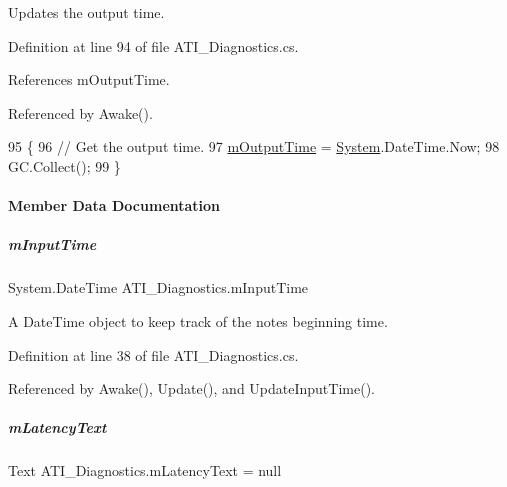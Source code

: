 Updates the output time. 



Definition at line 94 of file A\+T\+I\+\_\+\+Diagnostics.\+cs.



References m\+Output\+Time.



Referenced by Awake().


\begin{DoxyCode}
95     \{
96         \textcolor{comment}{// Get the output time.}
97         \hyperlink{group___audio_testing_a2e6f675a990948db789381f52071e1bf}{mOutputTime} = \hyperlink{namespace_system}{System}.DateTime.Now;
98         GC.Collect();
99     \}
\end{DoxyCode}


\paragraph{Member Data Documentation}
\mbox{\label{group___audio_testing_a683f09700eab208b7368ebcb82bbd3be}} 
\subparagraph{\texorpdfstring{m\+Input\+Time}{mInputTime}}
{\footnotesize\ttfamily System.\+Date\+Time A\+T\+I\+\_\+\+Diagnostics.\+m\+Input\+Time\hspace{0.3cm}{\ttfamily [private]}}



A Date\+Time object to keep track of the note\textquotesingle{}s beginning time. 



Definition at line 38 of file A\+T\+I\+\_\+\+Diagnostics.\+cs.



Referenced by Awake(), Update(), and Update\+Input\+Time().

\mbox{\label{group___audio_testing_a8929a6a2ae14ec733b936a72cb0f44a6}} 
\subparagraph{\texorpdfstring{m\+Latency\+Text}{mLatencyText}}
{\footnotesize\ttfamily Text A\+T\+I\+\_\+\+Diagnostics.\+m\+Latency\+Text = null\hspace{0.3cm}{\ttfamily [private]}}



